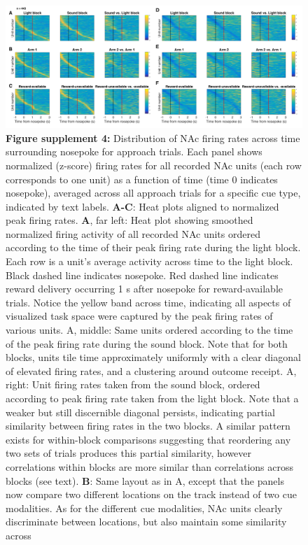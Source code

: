 \documentclass[11pt]{article}
\newcommand{\bsf}[1]{\textbf{#1}}
\begin{document}
 \begin{figure}[ht!]
\centering
\includegraphics[width=\textwidth]{Fig 8 - SUPP NP Task tiling.pdf}
\caption*{\bsf{Figure supplement 4:} Distribution of NAc firing rates across time surrounding nosepoke for approach
trials. Each panel shows normalized (z-score) firing rates for all recorded NAc units
(each row corresponds to one unit) as a function of time (time 0 indicates
nosepoke), averaged across all approach trials for a specific cue type,
indicated by text labels. \bsf{A-C}: Heat plots aligned to normalized peak firing rates. \bsf{A}, far left: Heat plot showing smoothed
normalized firing activity of all recorded NAc units ordered according to the
time of their peak firing rate during the light block. Each row is a unit’s
average activity across time to the light block. Black dashed line indicates
nosepoke. Red dashed line indicates reward delivery occurring 1 s after
nosepoke for reward-available trials. Notice the yellow band across time,
indicating all aspects of visualized task space were captured by the peak
firing rates of various units. A, middle: Same units ordered according to
the time of the peak firing rate during the sound block. Note that for both
blocks, units tile time approximately uniformly with a clear diagonal of
elevated firing rates, and a clustering around outcome receipt. A, right: Unit firing rates taken from the sound block, ordered according to peak
firing rate taken from the light block. Note that a weaker but still
discernible diagonal persists, indicating partial similarity between firing
rates in the two blocks. A similar pattern exists for within-block comparisons suggesting that
reordering any two sets of trials produces this partial similarity, however
correlations within blocks are more similar than correlations across blocks
(see text). \bsf{B}: Same layout as in A, except
that the panels now compare two different locations on the track instead of
two cue modalities. As for the different cue modalities, NAc units clearly
discriminate between locations, but also maintain some similarity across
}
\end{figure}
\end{document}
